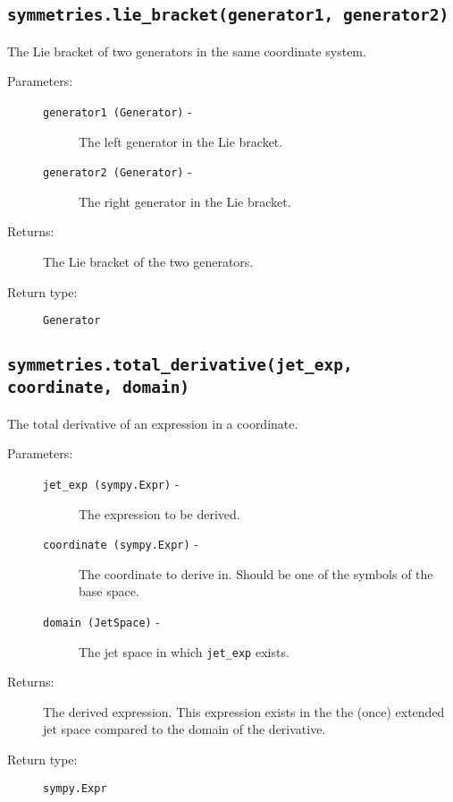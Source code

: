 \subsection*{\lstinline{symmetries.lie_bracket(generator1, generator2)}}

   The Lie bracket of two generators in the same coordinate system.

   \begin{description}
      \item[Parameters:] \leavevmode
        \begin{description}
            \item[\lstinline{generator1 (Generator)} -] The left generator in the Lie bracket.
            \item[\lstinline{generator2 (Generator)} -] The right generator in the Lie bracket.
        \end{description}
      \item[Returns:] The Lie bracket of the two generators.
      \item[Return type:] \lstinline{Generator}
   \end{description}

\subsection*{\lstinline{symmetries.total_derivative(jet_exp, coordinate, domain)}}

   The total derivative of an expression in a coordinate.

   \begin{description}
      \item[Parameters:] \leavevmode
        \begin{description}
            \item[\lstinline{jet_exp (sympy.Expr)} -] The expression to be derived.
            \item[\lstinline{coordinate (sympy.Expr)} -] The coordinate to derive in. Should be one of the symbols of the base space.
            \item[\lstinline{domain (JetSpace)} -] The jet space in which \lstinline{jet_exp} exists.
        \end{description}
      \item[Returns:] The derived expression. This expression exists in the the (once) extended jet space compared to the domain of the derivative.
      \item[Return type:] \lstinline{sympy.Expr}
   \end{description}

